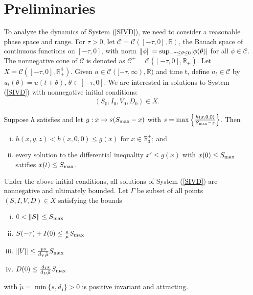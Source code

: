 \documentclass{CMHPhD-SIVD}
\begin{document}
\section{Preliminaries}
To analyze the dynamics of System (\ref{SIVD}), we need to consider a reasonable phase space and range. For $\tau>0$, let $\mathscr{C}=\mathcal{C}([-\tau,0],\mathbb{R})$, the Banach space of continuous functions on $[-\tau,0]$, with norm $\|\phi\|=\rm sup_{-\tau\leq\theta\leq0}|\phi(\theta)|$ for all $\phi\in\mathscr{C}$. The nonnegative cone of $\mathscr{C}$ is denoted as $\mathscr{C}^+=\mathcal{C}([-\tau,0],\mathbb{R}_+)$. Let $X=\mathcal{C}([-\tau,0],\mathbb{R}^4_+)$. Given $u\in\mathcal{C}([-\tau,\infty),\mathbb{R})$ and time t, define $u_t\in\mathscr{C}$ by $u_t(\theta) = u(t+\theta)$, $\theta\in[-\tau,0]$. 
We are interested in solutions to System (\ref{SIVD}) with nonnegative initial conditions:
\begin{align*}
(S_0, I_0, V_0, D_0) \in X.
\end{align*}

\begin{lemma}\label{2.1}
Suppose $h$ satisfies 
and let $g:x\to s(S_{\text{max}}-x)$ with $s=\max\left\{\frac{h(x,0,0)}{S_{\text{max}}-x}\right\}$.
Then
	\begin{enumerate}[(i)]
		\item $h(x,y,z)<h(x, 0, 0)\leq g(x)$ for $x\in\mathbb{R}_3^+$; and
		\item every solution to the differential inequality $x'\leq g(x)$ with $x(0)\leq S_{\text{max}}$ satifies $x(t)\leq S_{\text{max}}$.
	\end{enumerate}
\end{lemma}


\begin{proposition}  Under the above initial conditions, all solutions of System (\ref{SIVD}) are nonnegative and ultimately bounded. 
Let $\Gamma$ be subset of all points $(S, I, V, D) \in X$ satisfying the bounds

\begin{enumerate}[(i)]
	\item $0<\|S\|\leq S_{\text{max}}$
	\item $S(-\tau)+I(0)\leq\frac{s}{\tilde{\mu}} S_{\text{max}}$
	\item $\|V\|\leq\frac{ p s}{d_V\tilde{\mu}} S_{\text{max}}$
	\item $D(0)\leq\frac{d_I s}{d_D\tilde{\mu}} S_{\text{max}}$
\end{enumerate}
with $\tilde{\mu}=\min\{s,d_I\}>0$ is positive invariant and attracting.
\end{proposition}
\end{document}
